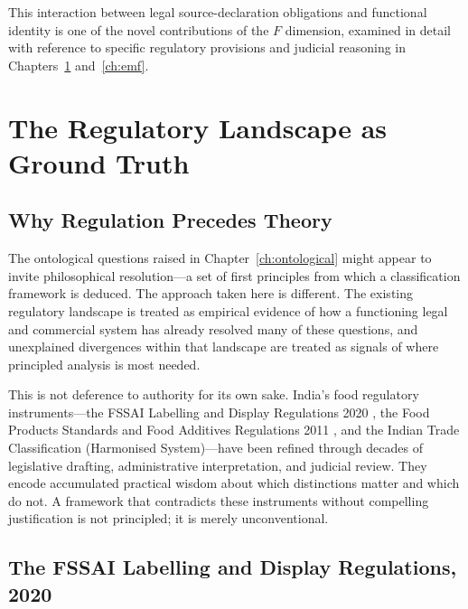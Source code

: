 \documentclass[12pt,a3paper]{article}
\begin{document}
This interaction between legal source-declaration obligations and functional identity is one of the novel contributions of the $F$ dimension, examined in detail with reference to specific regulatory provisions and judicial reasoning in Chapters~\ref{ch:regulatory} and~\ref{ch:emf}.

\newpage


\section{The Regulatory Landscape as Ground Truth}
\label{ch:regulatory}

\subsection{Why Regulation Precedes Theory}

The ontological questions raised in Chapter~\ref{ch:ontological} might appear to invite philosophical resolution---a set of first principles from which a classification framework is deduced. The approach taken here is different. The existing regulatory landscape is treated as empirical evidence of how a functioning legal and commercial system has already resolved many of these questions, and unexplained divergences within that landscape are treated as signals of where principled analysis is most needed.

This is not deference to authority for its own sake. India's food regulatory instruments---the FSSAI Labelling and Display Regulations 2020 \cite{FSSAI_Label_2020}, the Food Products Standards and Food Additives Regulations 2011 \cite{FSSAI_Additives_2011}, and the Indian Trade Classification (Harmonised System)---have been refined through decades of legislative drafting, administrative interpretation, and judicial review. They encode accumulated practical wisdom about which distinctions matter and which do not. A framework that contradicts these instruments without compelling justification is not principled; it is merely unconventional.

\subsection{The FSSAI Labelling and Display Regulations, 2020}
\end{document}
